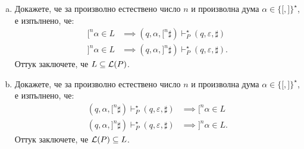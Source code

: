 \begin{example}
  \begin{enumerate}[a)]
  \item
    Докажете, че за произволно естествено число $n$ и произволна дума $\alpha \in \{\texttt{[}, \texttt{]}\}^\star$, е изпълнено, че:
    \begin{align*}
      \texttt{[}^n\alpha \in L & \implies (q, \alpha, \texttt{[}^n\sharp) \vdash^\star_P (q, \varepsilon, \sharp)\\
      \texttt{]}^n\alpha \in L & \implies (q, \alpha, \texttt{]}^n\sharp) \vdash^\star_P (q, \varepsilon, \sharp).
    \end{align*}
    Оттук заключете, че $L \subseteq \mathcal{L}(P)$.
  \item
    Докажете, че за произволно естествено число $n$ и произволна дума $\alpha \in \{\texttt{[}, \texttt{]}\}^\star$, е изпълнено, че:
    \begin{align*}
      (q, \alpha, \texttt{[}^n\sharp) \vdash^\star_P (q, \varepsilon, \sharp) & \implies \texttt{[}^n\alpha \in L\\
      (q, \alpha, \texttt{]}^n\sharp) \vdash^\star_P (q, \varepsilon, \sharp) & \implies \texttt{]}^n\alpha \in L.
    \end{align*}
    Оттук заключете, че $\mathcal{L}(P) \subseteq L$.
  \end{enumerate}
\end{example}

